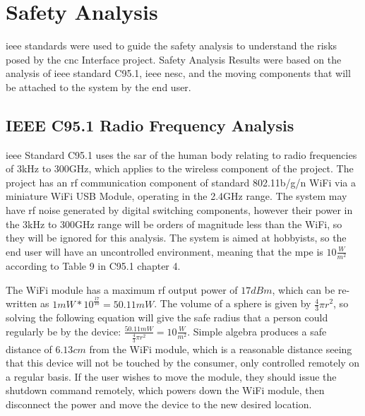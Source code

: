 \section{Safety Analysis}
\gls{ieee} standards were used to guide the safety analysis to understand the risks posed by the \gls{cnc} Interface project.
Safety Analysis Results were based on the analysis of \gls{ieee} standard C95.1\cite{ieeec951}, \gls{ieee} \gls{nesc}\cite{ieeenesc}, and the moving components that will be attached to the system by the end user. 

\subsection{IEEE C95.1 Radio Frequency Analysis}
\gls{ieee} Standard C95.1\cite{ieeec951} uses the \gls{sar} of the human body relating to radio frequencies of 3kHz to 300GHz, which applies to the wireless component of the project.
The project has an \gls{rf} communication component of standard 802.11b/g/n WiFi via a miniature WiFi USB Module, operating in the 2.4GHz range.
The system may have \gls{rf} noise generated by digital switching components, however their power in the 3kHz to 300GHz range will be orders of magnitude less than the WiFi, so they will be ignored for this analysis.
The system is aimed at hobbyists, so the end user will have an uncontrolled environment, meaning that the \gls{mpe} is $10\frac{W}{m^2}$ according to Table 9 in C95.1 chapter 4\cite{ieeec951}.

The WiFi module has a maximum \gls{rf} output power of $17dBm$, which can be re-written as $1mW*10^{\frac{17}{10}}=50.11mW$.
The volume of a sphere is given by $\frac{4}{3}\pi r^2$, so solving the following equation will give the safe radius that a person could regularly be by the device: $\frac{50.11mW}{\frac{4}{3}\pi r^2}=10\frac{W}{m^2}$.
Simple algebra produces a safe distance of $6.13cm$ from the WiFi module, which is a reasonable distance seeing that this device will not be touched by the consumer, only controlled remotely on a regular basis. 
If the user wishes to move the module, they should issue the shutdown command remotely, which powers down the WiFi module, then disconnect the power and move the device to the new desired location.

